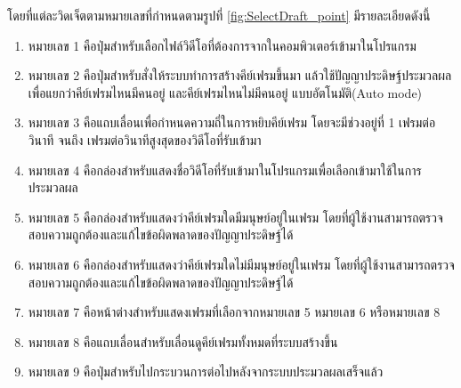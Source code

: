 โดยที่แต่ละวิดเจ็ตตามหมายเลขที่กำหนดตามรูปที่ \ref{fig:SelectDraft_point} มีรายละเอียดดังนี้
\begin{enumerate}
	\setlength\itemsep{-0.25em}
	\item หมายเลข 1 คือปุ่มสำหรับเลือกไฟล์วิดีโอที่ต้องการจากในคอมพิวเตอร์เข้ามาในโปรแกรม
    \item หมายเลข 2 คือปุ่มสำหรับสั่งให้ระบบทำการสร้างคีย์เฟรมขึ้นมา 
    แล้วใช้ปัญญาประดิษฐ์ประมวลผลเพื่อแยกว่าคีย์เฟรมไหนมีคนอยู่ และคีย์เฟรมไหนไม่มีคนอยู่
    แบบอัตโนมัติ(Auto mode)
    \item หมายเลข 3 คือแถบเลื่อนเพื่อกำหนดความถี่ในการหยิบคีย์เฟรม โดยจะมีช่วงอยู่ที่ 1 
    เฟรมต่อวินาที จนถึง เฟรมต่อวินาทีสูงสุดของวิดีโอที่รับเข้ามา
	\item หมายเลข 4 คือกล่องสำหรับแสดงชื่อวิดีโอที่รับเข้ามาในโปรแกรมเพื่อเลือกเข้ามาใช้ในการประมวลผล
	\item หมายเลข 5 คือกล่องสำหรับแสดงว่าคีย์เฟรมใดมีมนุษย์อยู่ในเฟรม โดยที่ผู้ใช้งานสามารถตรวจสอบความถูกต้องและแก้ไขข้อผิดพลาดของปัญญาประดิษฐ์ได้
	\item หมายเลข 6 คือกล่องสำหรับแสดงว่าคีย์เฟรมใดไม่มีมนุษย์อยู่ในเฟรม โดยที่ผู้ใช้งานสามารถตรวจสอบความถูกต้องและแก้ไขข้อผิดพลาดของปัญญาประดิษฐ์ได้
	\item หมายเลข 7 คือหน้าต่างสำหรับแสดงเฟรมที่เลือกจากหมายเลข 5 หมายเลข 6 หรือหมายเลข 8
	\item หมายเลข 8 คือแถบเลื่อนสำหรับเลื่อนดูคีย์เฟรมทั้งหมดที่ระบบสร้างขึ้น
	\item หมายเลข 9 คือปุ่มสำหรับไปกระบวนการต่อไปหลังจากระบบประมวลผลเสร็จแล้ว
\end{enumerate}
\clearpage

